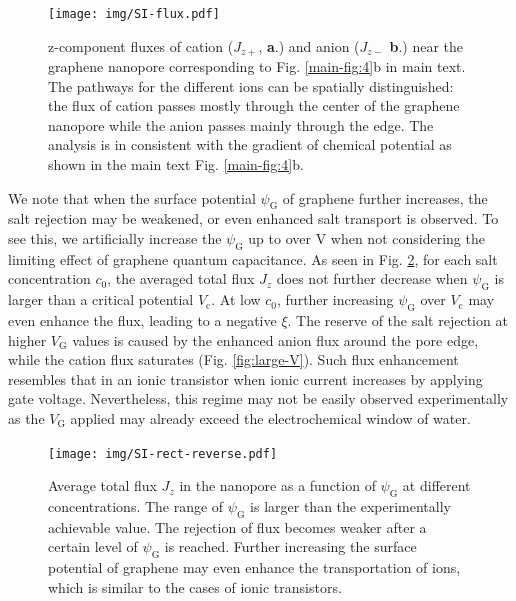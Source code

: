 \documentclass[manuscript=suppinfo,email=true, hyperref=true, keywords=false]{achemso}
\newcommand{\Fig}{Fig.}
\begin{document}
\begin{figure}[htbp]
  \centering
  \texttt{[image: img/SI-flux.pdf]}
  \caption{z-component fluxes of cation ($J_{z+}$, \textbf{a}.)  and
    anion ($J_{z-}$ \textbf{b}.) near the graphene nanopore
    corresponding to \Fig{} \ref{main-fig:4}b in main text. The
    pathways for the different ions can be spatially distinguished:
    the flux of cation passes mostly through the center of the
    graphene nanopore while the anion passes mainly through the
    edge. The analysis is in consistent with the gradient of chemical
    potential as shown in the main text \Fig{} \ref{main-fig:4}b.}
  \label{fig:flux}
\end{figure}

We note that when the surface potential $\psi_{\mathrm{G}}$ of
graphene further increases, the salt rejection may be weakened, or
even enhanced salt transport is observed. To see this, we artificially
increase the $\psi_{\mathrm{G}}$ up to over \unit[1]{V} when not considering
the limiting effect of graphene quantum capacitance. As seen in \Fig{}
\ref{fig:reverse}, for each salt concentration $c_{0}$, the averaged
total flux $J_{z}$ does not further decrease when $\psi_{\mathrm{G}}$
is larger than a critical potential $V_{\mathrm{c}}$. At low $c_{0}$,
further increasing $\psi_{\mathrm{G}}$ over $V_{\mathrm{c}}$ may even
enhance the flux, leading to a negative $\xi$. The reserve of the salt
rejection at higher $V_{\mathrm{G}}$ values is caused by the enhanced
anion flux around the pore edge, while the cation flux saturates
(\Fig{} \ref{fig:large-V}). Such flux enhancement resembles that in an
ionic transistor \cite{Nam_2009,Cheng_2018} when ionic current increases
by applying gate voltage. Nevertheless, this regime may not be easily observed experimentally as the $V_{\mathrm{G}}$ applied may already
exceed the electrochemical window of water.

\begin{figure}[htbp]
  \centering
  \texttt{[image: img/SI-rect-reverse.pdf]}
  \caption{Average total flux $J_{z}$ in the nanopore as
    a function of $\psi_{\mathrm{G}}$ at different concentrations. The
    range of $\psi_{\mathrm{G}}$ is larger than the experimentally
    achievable value. The rejection of flux becomes weaker after a
    certain level of $\psi_{\mathrm{G}}$ is reached. Further
    increasing the surface potential of graphene may even enhance the
    transportation of ions, which is similar to the cases of ionic
    transistors.}
  \label{fig:reverse}
\end{figure}
\end{document}
